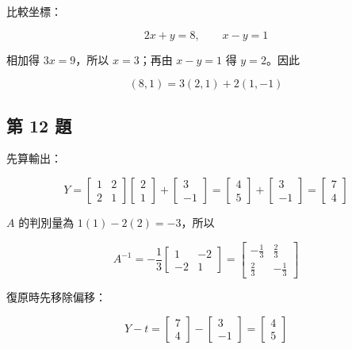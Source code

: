 \documentclass[11pt,a4paper]{article}
\begin{document}
比較坐標：

\[
2x+y=8,
\qquad
x-y=1
\]

相加得 \(3x=9\)，所以 \(x=3\)；再由 \(x-y=1\) 得 \(y=2\)。因此

\[
(8,1)=3(2,1)+2(1,-1)
\]

\subsection{第 12 題}\label{ux7b2c-12-ux984c}

先算輸出：

\[
Y=
\begin{bmatrix}1&2\\2&1\end{bmatrix}
\begin{bmatrix}2\\1\end{bmatrix}
+\begin{bmatrix}3\\-1\end{bmatrix}
=\begin{bmatrix}4\\5\end{bmatrix}
+\begin{bmatrix}3\\-1\end{bmatrix}
=\begin{bmatrix}7\\4\end{bmatrix}
\]

\(A\) 的判別量為 \(1(1)-2(2)=-3\)，所以

\[
A^{-1}
=-\frac13\begin{bmatrix}1&-2\\-2&1\end{bmatrix}
=\begin{bmatrix}-\frac13&\frac23\\\frac23&-\frac13\end{bmatrix}
\]

復原時先移除偏移：

\[
Y-t=\begin{bmatrix}7\\4\end{bmatrix}
-\begin{bmatrix}3\\-1\end{bmatrix}
=\begin{bmatrix}4\\5\end{bmatrix}
\]
\end{document}
